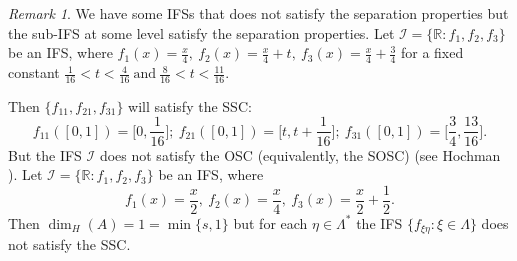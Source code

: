 \documentclass{amsproc}
\theoremstyle{definition}
\newtheorem{example}[theorem]{Example}
\theoremstyle{remark}
\newtheorem{remark}[theorem]{Remark}
\numberwithin{equation}{section}
\begin{document}

\begin{remark}
We have some IFSs that does not satisfy the separation properties but the sub-IFS at some level satisfy the separation properties. Let $\mathcal{I}=\{\mathbb{R}:f_1,f_2,f_3\}$ be an IFS, where $f_1(x)=\frac{x}{4},~f_2(x)= \frac{x}{4}+t,~f_3(x)=\frac{x}{4}+\frac{3}{4}$ for a fixed constant
$ \frac{1}{16} < t < \frac{4}{16} ~\text{and}~\frac{8}{16} < t < \frac{11}{16}.$

Then $\{f_{11},f_{21},f_{31}\}$ will satisfy the SSC:
\[
f_{11}([0,1])= \Big[0,\frac{1}{16}\Big];~ f_{21}([0,1])=\Big[t,t+\frac{1}{16}\Big];~ f_{31}([0,1])=\Big[\frac{3}{4},\frac{13}{16}\Big].
\]
But the IFS $\mathcal{I}$ does not satisfy the OSC (equivalently, the SOSC) (see Hochman \cite{MHOCHMAN}).
Let $\mathcal{I}=\{\mathbb{R}:f_1,f_2,f_3\}$ be an IFS, where
\[
f_1(x)=\frac{x}{2},~f_2(x)= \frac{x}{4},~f_3(x)=\frac{x}{2}+\frac{1}{2}.
\]
Then $\dim_H(A)=1=\min\{s,1\}$ but for each $\eta \in \Lambda^*$ the IFS $\{f_{\xi \eta}: \xi \in \Lambda\}$ does not satisfy the SSC.
\end{remark}
\end{document}
